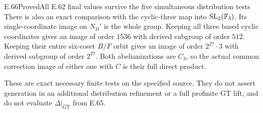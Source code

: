 \begin{statement}{E.66}{Proved}{All E.62 final values survive the five simultaneous distribution tests}
There is also an exact comparison with the cyclic-three map into
$\mathrm{SL}_2(\mathbb F_3)$. Its single-coordinate image on $N_B'$ is
the whole group. Keeping all three based cyclic coordinates gives
an image of order $1536$ with derived subgroup of order $512$.
Keeping their entire six-coset $B/F$ orbit gives an image of
order $2^{27}\cdot3$ with derived subgroup of order $2^{27}$.
Both abelianizations are $C_3$, so the actual common correction
image of either one with $C$ is their full direct product.

These are exact necessary finite tests on the specified source.
They do not assert generation in an additional distribution
refinement or a full profinite GT lift, and do not evaluate
$\Delta|_{\widehat{\mathrm{GT}}}$ from E.65.
\end{statement}

